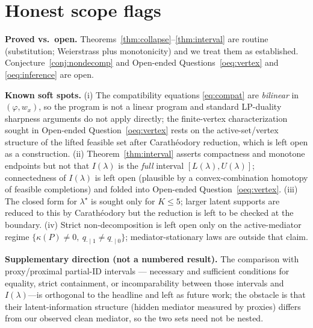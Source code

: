 \documentclass[11pt]{article}
\theoremstyle{definition}
\theoremstyle{plain}
\theoremstyle{remark}
\begin{document}
\section{Honest scope flags}
\label{sec:scope}
\textbf{Proved vs.\ open.} Theorems~\ref{thm:collapse}--\ref{thm:interval} are routine
(substitution; Weierstrass plus monotonicity) and we treat them as established. Conjecture~\ref{conj:nondecomp}
and Open-ended Questions~\ref{oeq:vertex} and \ref{oeq:inference} are open.

\textbf{Known soft spots.} (i) The compatibility equations \eqref{eq:compat} are \emph{bilinear} in
$(\varphi,w_x)$, so the program is not a linear program and standard LP-duality sharpness arguments do not
apply directly; the finite-vertex characterization sought in Open-ended Question~\ref{oeq:vertex} rests on
the active-set/vertex structure of the lifted feasible set after Carath\'eodory reduction, which is left
open as a construction.
(ii) Theorem~\ref{thm:interval} asserts compactness and monotone endpoints but not that $I(\lambda)$ is the
\emph{full} interval $[L(\lambda),U(\lambda)]$; connectedness of $I(\lambda)$ is left open (plausible by a
convex-combination homotopy of feasible completions) and folded into Open-ended Question~\ref{oeq:vertex}.
(iii) The closed form for $\lambda^\star$ is sought only for $K\le5$; larger latent supports are reduced
to this by Carath\'eodory but the reduction is left to be checked at the boundary.
(iv) Strict non-decomposition is left open only on the active-mediator regime
$\{\kappa(P)\neq0,\ q_{\cdot\mid1}\neq q_{\cdot\mid0}\}$; mediator-stationary laws are outside that claim.

\textbf{Supplementary direction (not a numbered result).} The comparison with proxy/proximal partial-ID
intervals \citep{GhassamiShpitserTchetgen2023ProxyPartialID,GhassamiYangShpitserTchetgen2021HiddenMediators}---
necessary and sufficient conditions for equality, strict containment, or incomparability between those
intervals and $I(\lambda)$---is orthogonal to the headline and left as future work; the obstacle is that
their latent-information structure (hidden mediator measured by proxies) differs from our observed clean
mediator, so the two sets need not be nested.
\end{document}
